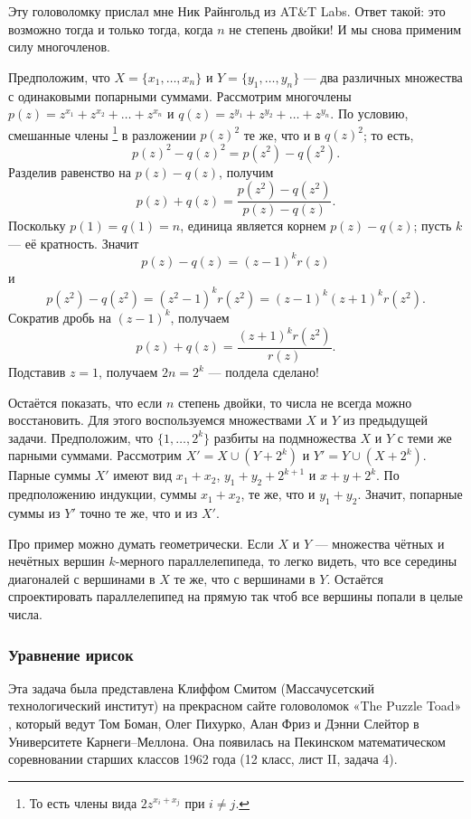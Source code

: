 Эту головоломку прислал мне Ник Райнгольд из AT\&T Labs.
Ответ такой: это возможно тогда и только тогда, когда $n$ не степень двойки!
И мы снова применим силу многочленов.

Предположим, что $X = \{x_1 , \dots , x_n\}$ и $Y = \{y_1 , \dots , y_n\}$ --- два различных множества с одинаковыми попарными суммами.
Рассмотрим многочлены
$p(z)=z^{x_1} + z^{x_2} + \dots + z^{x_n}$
и 
$q(z)=z^{y_1} + z^{y_2} + \dots + z^{y_n}$.
По условию, смешанные члены%
\footnote{То есть члены вида $2z^{x_i+x_j}$ при $i\ne j$.} в разложении $p(z)^2$ те же, что и в $q(z)^2$;
то есть,
\[p(z)^2 -q(z)^2 = p(z^2 )-q(z^2).\]
Разделив равенство на $p(z) - q(z)$, получим
\[p(z) + q(z) =
\frac{p(z^2 ) - q(z^2 )}{p(z) - q(z)}.
\]
Поскольку $p(1) = q(1) = n$,
единица является корнем $p(z) - q(z)$; пусть $k$ --- её кратность.
Значит
\[p(z) - q(z) = (z - 1)^k r(z)\]
и
\[p(z^2 ) - q(z^2 ) = (z^2 - 1)^k r(z^2 )= (z - 1)^k (z + 1)^k r(z^2).\]
Сократив дробь на $(z - 1)^k$, получаем
\[p(z) + q(z) =
\frac{(z + 1)^k r(z^2)}{r(z)}.
\]
Подставив $z = 1$, получаем $2n = 2^k$ --- полдела сделано!

Остаётся показать, что если $n$ степень двойки, то
числа не всегда можно восстановить.
Для этого воспользуемся множествами $X$ и $Y$ из предыдущей задачи.
Предположим, что $\{1, \dots , 2^k\}$ разбиты на подмножества $X$ и $Y$ с теми же парными суммами.
Рассмотрим $X' = X \cup (Y + 2^k)$ и $Y' = Y \cup (X + 2^k)$.
Парные суммы $X'$ имеют вид $x_1 + x_2$, $y_1 + y_2 + 2^{k+1}$ и $x + y + 2^k$.
По предположению индукции,
суммы $x_1 + x_2$, те же, что и $y_1 + y_2$.
Значит, попарные суммы из $Y'$ точно те же, что и из $X'$.

\begin{addedbytheeditors}
Про пример можно думать геометрически.
Если $X$ и $Y$ --- множества чётных и нечётных вершин $k$-мерного параллелепипеда, то легко видеть, что все середины диагоналей с вершинами в $X$ те же, что с вершинами в $Y$.
Остаётся спроектировать параллелепипед на прямую так чтоб все вершины попали в целые числа.\pr
\end{addedbytheeditors}

\subsubsection*{Уравнение ирисок}

Эта задача была представлена Клиффом Смитом (Массачусетский технологический институт) на прекрасном сайте головоломок «The Puzzle Toad» \cite{bohman-pikhurko-frieze-sleator}, который ведут Том Боман, Олег Пихурко, Алан Фриз и Дэнни Слейтор в Университете Карнеги--Меллона.
Она появилась на Пекинском математическом соревновании старших классов 1962 года (12 класс, лист II, задача 4).

